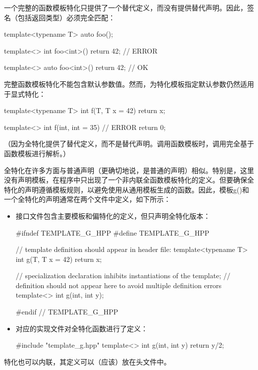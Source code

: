 一个完整的函数模板特化只提供了一个替代定义，而没有提供替代声明。因此，签名（包括返回类型）必须完全匹配：

\begin{cpp}
template<typename T> auto foo();

template<> int foo<int>() { return 42; }  // ERROR

template<> auto foo<int>() { return 42; } // OK
\end{cpp}

完整函数模板特化不能包含默认参数值。然而，为特化模板指定默认参数仍然适用于显式特化：

\begin{cpp}
template<typename T>
int f(T, T x = 42) {
	return x;
}

template<> int f(int, int = 35) { // ERROR
	return 0;
}
\end{cpp}

（因为全特化提供了替代定义，而不是替代声明。调用函数模板时，调用完全基于函数模板进行解析。）

全特化在许多方面与普通声明（更确切地说，是普通的声明）相似。特别是，这里没有声明模板，在程序中只出现了一个非内联全函数模板特化的定义。但要确保全特化的声明遵循模板规则，以避免使用从通用模板生成的函数。因此，模板g()和一个全特化的声明通常在两个文件中定义，如下所示：

\begin{itemize}
\item 
接口文件包含主要模板和偏特化的定义，但只声明全特化版本：

\begin{cpp}
#ifndef TEMPLATE_G_HPP
#define TEMPLATE_G_HPP

// template definition should appear in header file:
template<typename T>
int g(T, T x = 42) {
	return x;
}

// specialization declaration inhibits instantiations of the template;
// definition should not appear here to avoid multiple definition errors
template<> int g(int, int y);

#endif // TEMPLATE_G_HPP
\end{cpp}

\item 
对应的实现文件对全特化函数进行了定义：

\begin{cpp}
#include "template_g.hpp"
template<> int g(int, int y) {
	return y/2;
}
\end{cpp}
\end{itemize}

特化也可以内联，其定义可以（应该）放在头文件中。

